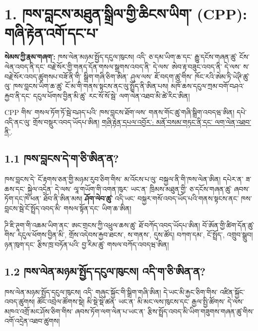 \documentclass[11pt]{article}
\begin{document}
\section*{1. ཁས་བླངས་མཐུན་སྒྲིལ་གྱི་ཆིངས་ཡིག་ (CPP): གཞི་རྟེན་འགོ་དང་པ་}

\textbf{སེམས་ཀྱི་རྣམ་གཞག་:} ཁས་ལེན་མཉམ་སྤྱོད་དངུལ་ཁུངས། འདི་ ཅ་དམ་ཡིག་ཆ་དང་ རྒྱུ་དངོས་གཞན་ཚུ་ ངོས་ལེན་འབད་ནི་དང་ བརྗེ་སོར་གྱི་གནད་དོན་གསལ་སྒྲགས་འབད་ནི་ དེ་ལས་ ཨེབ་རྟ་བཟུང་འབད་ནི་ དེ་ལས་ ས་བརྗེ་སོར་འབད་ཚུགསཔ་བཟོ་ནི་གི་ སྒྲིག་གཞི་ཅིག་ཨིན་ ཤུལ་ལས་ ཇོ་བདག་ཚུ་གིས་ ཁོང་རའི་ཨེམ་ཏི་ཡེཊི་ཚུ་ལུ་ ཁས་བླངས་ཡིག་ཆ་ཚུ་ ངོ་མ་གི་གནས་སྟངས་ནང་ལུ་སྤྲོད་ནི་ཨིན་པས། མཁོ་ཆས་དངུལ་ཀྲམ་བགོ་བཤའ་རྐྱབ་ནི་དང་ དངུལ་ཕོགས་བྱིན་མི་ཚུ་ རང་སོ་སོ་སྦེ་ ལག་ལེན་འཐབ་མི་ཚེ་རིང་ཨིན།

CPP གིས་ གསལ་ཏོག་ཏོ་སྦེ་བཤད་པའི་ ཁས་བླངས་ཐོག་ལས་ གནས་གོང་ཚུ་གཞི་སྒྲིག་འབདཝ་ཨིན། དཔེ་འདི་ནང་ལུ་ གྲོས་བསྡུར་འབད་ཡོདཔ་ཨིན། \href{https://willruddick.substack.com/p/grassroots-economics-the-book-is}{གཞི་རྟེན་དཔལ་འབྱོར་: མནོ་བསམ་གཏང་ནི་དང་ ལག་ལེན་འཐབ་ནི་}.

\subsection*{1.1 ཁས་བླངས་དེ་ག་ཅི་ཨིན་ན?}

ཁས་བླངས་དེ་ ངོ་རྟགས་ཅན་གྱི་མཉམ་རུབ་ཅིག་གིས་ མ་འོངས་པ་ལུ་ བསྐྱལ་ནི་གི་ཁས་ལེན་ཨིན། དཔེར་ན་ ཟ་ཆས་དང་ སྐྱེལ་འདྲེན་ དེ་ལས་ ལཱ་གཡོག་གི་འགན་ཁུར་ ཡང་ན་ ཁྲིམས་མཐུན་གྱི་ ཅ་དངོས་གཞན་ཚུ་ ཞབས་ཏོག་དང་ཁེ་ཕན་ ཐོབ་ནི་ཨིན་མས། \textbf{ཤོག་ལེབ་ཚུ་} འདི་ཡང་ བསྐྱར་གསོ་འབད་ཡོད་པའི་གནས་སྟངས་ནང་ ཁས་བླངས་སྦེ་ངོ་སྤྲོད་འབད་མི་ གསལ་སྟོན་དང་ ཡིག་ཆ་ཨིན།

ཌི་ཇི་ཊཱག་གི་འཆམ་ཡིག་ནང་ ཨང་གྲངས་ཀྱི་འཕྲུལ་ཆས་ཚུ་ ཐོ་བཀོད་འབད་ཡོདཔ་ཨིན། བོ་ཨོན་གྱི་ཚིག་དོན་ཚུ་གིས་ དངུལ་ཕོགས་བྱིན་མི་, གྲོས་འདེབས་རྐྱབ་ཐངས་, ས་གནས་, དུས་ཚོད། བཀག་དམ་, ངོ་སྤྲོད་, འགྲུབ་སྒྲུབ། ཉན་ཁུག་དང་ རྩིས་ཁྲ་བཏོན་པའི་ བྱ་རིམ་ཚུ་ གསལ་བཀོད་འབདཝ་ཨིན།

\subsection*{1.2 ཁས་ལེན་མཉམ་སྤྱོད་དངུལ་ཁུངས། འདི་ག་ཅི་ཨིན་ན?}

ཁས་ལེན་མཉམ་སྤྱོད་དངུལ་ཁུངས། འདི་ གཞུང་སྐྱོང་གི་སྒྲིག་གཞི་ཨིན། དེ་ཡང་མི་རྐྱང་ཅིག་གིས་ འཛིན་སྐྱོང་འབད་ཚུགས། ཚོང་འབྲེལ་ཚོགས་སྡེ། མི་སྡེ་སྡེ་ཚན་ ཡང་ན་ མི་མང་ལས་ཁུངས་དང་ རྒྱལ་སྤྱི་ཚོགས་ དེ་ལས་ མཁའ་འགྲོ་མང་ཤོས་ཅིག་གིས་ ཞབས་ཏོག་ལག་ལེན་པ་ཡང་ན་ རྩིས་སྤྲོད་འབད་མི་ཡིག་གཟུགས་གཞན་ཚུ་གིས་ འགོ་འདྲེན་འཐབ་ཚུགས།
\end{document}
